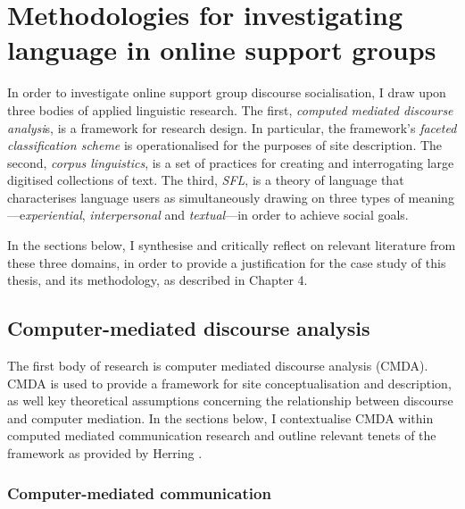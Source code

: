 \section{Methodologies for investigating language in online support groups}

	In order to investigate online support group discourse socialisation, I draw upon three bodies of applied linguistic research. The first, \emph{computed mediated discourse analysi}s, is a framework for research design. In particular, the framework's \emph{faceted classification scheme} is operationalised for the purposes of site description. The second, \emph{corpus linguistics}, is a set of practices for creating and interrogating large digitised collections of text. The third, \emph{SFL}, is a theory of language that characterises language users as simultaneously drawing on three types of meaning---e\emph{xperiential}, \emph{interpersonal} and \emph{textual}---in order to achieve social goals. 

	In the sections below, I synthesise and critically reflect on relevant literature from these three domains, in order to provide a justification for the case study of this thesis, and its methodology, as described in Chapter 4.

	\subsection{Computer-mediated discourse analysis}

   		The first body of research is computer mediated discourse analysis (CMDA).  CMDA is used to provide a framework for site conceptualisation and description, as well key theoretical assumptions concerning the relationship between discourse and computer mediation. In the sections below, I contextualise CMDA within computed mediated communication research and outline relevant tenets of the framework as provided by Herring \citeyear{herring_computer-mediated_2001,herring_computer-mediated_2004,herring_faceted_2007,herring_discourse_2011,herring_computer-mediated_2011}.


		\subsubsection{Computer-mediated communication}

